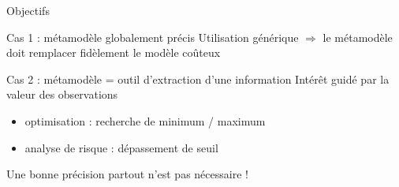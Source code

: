 \begin{frame}{Objectifs}
\begin{block}{Cas 1 : métamodèle globalement précis}
Utilisation générique $\Rightarrow$ le métamodèle doit remplacer fidèlement le modèle coûteux
\end{block}

\begin{exampleblock}{Cas 2 : métamodèle = outil d'extraction d'une information}
Intérêt guidé par la valeur des observations
\begin{itemize}
 \item optimisation : recherche de minimum / maximum
 \item analyse de risque : dépassement de seuil
\end{itemize}
Une bonne précision partout n'est pas nécessaire !
\end{exampleblock}
\end{frame}
